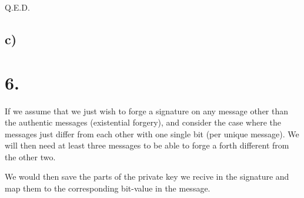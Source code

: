 \documentclass[a4paper,11pt]{article}
\begin{document}
	Q.E.D.

	\subsection*{c) }

	\section*{6. }
	If we assume that we just wish to forge a signature on any message other than the authentic
	messages (existential forgery), and consider the case where the messages just differ from 
	each other with one single bit (per unique message). We will then need at least three 
	messages to be able to forge a forth different from the other two.

	We would then save the parts of the private key we recive in the signature and map
	them to the corresponding bit-value in the message.

		 
		
\end{document}
